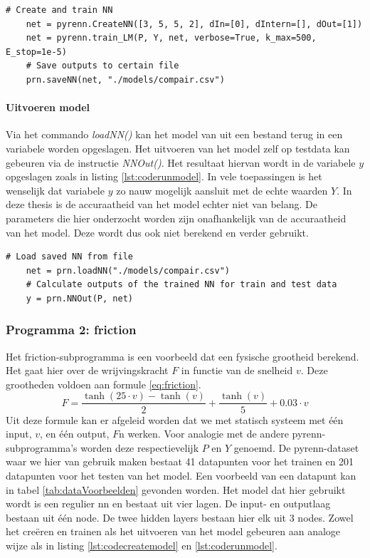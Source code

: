 			\begin{lstlisting}[caption={Cre\"eren en trainen van pyrenn-model.},captionpos=b, label = {lst:codecreatemodel}]
	# Create and train NN
	net = pyrenn.CreateNN([3, 5, 5, 2], dIn=[0], dIntern=[], dOut=[1])
	net = pyrenn.train_LM(P, Y, net, verbose=True, k_max=500, E_stop=1e-5)
	# Save outputs to certain file
	prn.saveNN(net, "./models/compair.csv")
			\end{lstlisting}
			
			\paragraph{Uitvoeren model} 
			Via het commando \textit{loadNN()} kan het model van uit een bestand terug in een variabele worden opgeslagen. Het uitvoeren van het model zelf op testdata kan gebeuren via de instructie \textit{NNOut()}. Het resultaat hiervan wordt in de variabele $y$ opgeslagen zoals in listing \ref{lst:coderunmodel}. In vele toepassingen is het wenselijk dat variabele $y$ zo nauw mogelijk aansluit met de echte waarden $Y$. In deze thesis is de accuraatheid van het model echter niet van belang. De parameters die hier onderzocht worden zijn onafhankelijk van de accuraatheid van het model. Deze wordt dus ook niet berekend en verder gebruikt. 
	\begin{lstlisting}[caption={uitvoeren van pyrenn-model.},captionpos=b, label = {lst:coderunmodel}]
	# Load saved NN from file
	net = prn.loadNN("./models/compair.csv")
	# Calculate outputs of the trained NN for train and test data	
	y = prn.NNOut(P, net)
	\end{lstlisting}
		
		\subsubsection{Programma 2: friction}
		Het friction-subprogramma is een voorbeeld dat een fysische grootheid berekend. Het gaat hier over de wrijvingskracht $F$ in functie van de snelheid $v$. Deze grootheden voldoen aan formule \ref{eq:friction}. 
		\begin{equation}\label{eq:friction}
					F = \frac{\tanh(25 \cdot v)- \tanh(v)}{2} + \frac{\tanh(v)}{5}+0.03\cdot v			
		\end{equation}
		Uit deze formule kan er afgeleid worden dat we met statisch systeem met \'e\'en input, $v$, en \'e\'en output, $F$n werken. Voor analogie met de andere pyrenn-subprogramma's worden deze respectievelijk $P$ en $Y$ genoemd. De pyrenn-dataset waar we hier van gebruik maken bestaat 41 datapunten voor het trainen en 201 datapunten voor het testen van het model. Een voorbeeld van een datapunt kan in tabel \ref{tab:dataVoorbeelden} gevonden worden. Het model dat hier gebruikt wordt is een regulier \gls{nn} en bestaat uit vier lagen. De input- en outputlaag bestaan uit \'e\'en node. De twee hidden layers bestaan hier elk uit 3 nodes. Zowel het cre\"eren en trainen als het uitvoeren van het model gebeuren aan analoge wijze als in listing \ref{lst:codecreatemodel} en \ref{lst:coderunmodel}.
						
